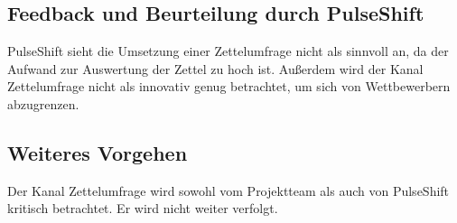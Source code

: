 \subsection{Feedback und Beurteilung durch PulseShift}

PulseShift sieht die Umsetzung einer Zettelumfrage nicht als sinnvoll an, da der Aufwand zur Auswertung der Zettel zu hoch ist. Außerdem wird der Kanal Zettelumfrage nicht als innovativ genug betrachtet, um sich von Wettbewerbern abzugrenzen.

\subsection{Weiteres Vorgehen}

Der Kanal Zettelumfrage wird sowohl vom Projektteam als auch von PulseShift kritisch betrachtet. Er wird nicht weiter verfolgt.
